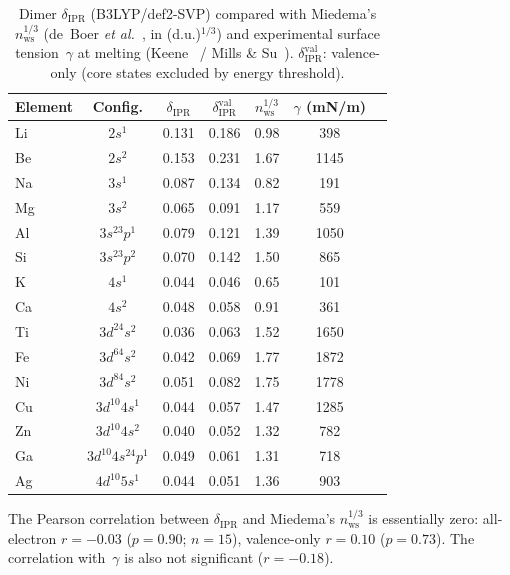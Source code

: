 \documentclass[twocolumn,showpacs,preprintnumbers,amsmath,amssymb,prb]{revtex4-2}
\begin{document}
\begin{table}[htb]
  \centering
  \caption{Dimer $\delta_\mathrm{IPR}$ (B3LYP/def2-SVP)
    compared with Miedema's $n_\mathrm{ws}^{1/3}$
    (de~Boer \textit{et al.}~\cite{deBoer1988}, in (d.u.)$^{1/3}$)
    and experimental surface tension~$\gamma$ at melting
    (Keene~\cite{Keene1993} / Mills \& Su~\cite{MillsSu2006}).
    $\delta_\mathrm{IPR}^\mathrm{val}$: valence-only
    (core states excluded by energy threshold).}
  \label{tab:delta_nws}
  \begin{ruledtabular}
  \begin{tabular}{lcccccc}
    Element & Config. & $\delta_\mathrm{IPR}$ &
      $\delta_\mathrm{IPR}^\mathrm{val}$ &
      $n_\mathrm{ws}^{1/3}$ & $\gamma$ (mN/m) \\
    \hline
    Li  & $2s^1$                & 0.131 & 0.186 & 0.98 &  398 \\
    Be  & $2s^2$                & 0.153 & 0.231 & 1.67 & 1145 \\
    Na  & $3s^1$                & 0.087 & 0.134 & 0.82 &  191 \\
    Mg  & $3s^2$                & 0.065 & 0.091 & 1.17 &  559 \\
    Al  & $3s^23p^1$            & 0.079 & 0.121 & 1.39 & 1050 \\
    Si  & $3s^23p^2$            & 0.070 & 0.142 & 1.50 &  865 \\
    K   & $4s^1$                & 0.044 & 0.046 & 0.65 &  101 \\
    Ca  & $4s^2$                & 0.048 & 0.058 & 0.91 &  361 \\
    Ti  & $3d^24s^2$            & 0.036 & 0.063 & 1.52 & 1650 \\
    Fe  & $3d^64s^2$            & 0.042 & 0.069 & 1.77 & 1872 \\
    Ni  & $3d^84s^2$            & 0.051 & 0.082 & 1.75 & 1778 \\
    Cu  & $3d^{10}4s^1$         & 0.044 & 0.057 & 1.47 & 1285 \\
    Zn  & $3d^{10}4s^2$         & 0.040 & 0.052 & 1.32 &  782 \\
    Ga  & $3d^{10}4s^24p^1$     & 0.049 & 0.061 & 1.31 &  718 \\
    Ag  & $4d^{10}5s^1$         & 0.044 & 0.051 & 1.36 &  903 \\
  \end{tabular}
  \end{ruledtabular}
\end{table}

The Pearson correlation between $\delta_\mathrm{IPR}$ and
Miedema's $n_\mathrm{ws}^{1/3}$ is essentially zero:
all-electron $r = -0.03$ ($p = 0.90$; $n = 15$),
valence-only $r = 0.10$ ($p = 0.73$).
The correlation with~$\gamma$ is also not significant
($r = -0.18$).
\end{document}
